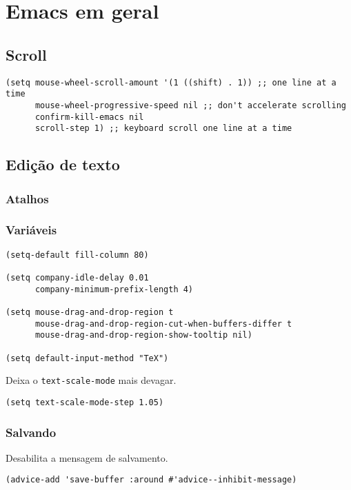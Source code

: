 \documentclass[11pt]{article}
\begin{document}
\section{Emacs em geral}
\label{sec:org9572b80}
\subsection{Scroll}
\label{sec:org4892092}
\begin{verbatim}
(setq mouse-wheel-scroll-amount '(1 ((shift) . 1)) ;; one line at a time
      mouse-wheel-progressive-speed nil ;; don't accelerate scrolling
      confirm-kill-emacs nil
      scroll-step 1) ;; keyboard scroll one line at a time
\end{verbatim}

\subsection{Edição de texto}
\label{sec:org3cc2396}
\subsubsection{Atalhos}
\label{sec:org36a08b4}
\subsubsection{Variáveis}
\label{sec:orgeaff0ac}
\begin{verbatim}
(setq-default fill-column 80)

(setq company-idle-delay 0.01
      company-minimum-prefix-length 4)

(setq mouse-drag-and-drop-region t
      mouse-drag-and-drop-region-cut-when-buffers-differ t
      mouse-drag-and-drop-region-show-tooltip nil)

(setq default-input-method "TeX")
\end{verbatim}

Deixa o \texttt{text-scale-mode} mais devagar.

\begin{verbatim}
(setq text-scale-mode-step 1.05)
\end{verbatim}
\subsubsection{Salvando}
\label{sec:org403bc5c}
Desabilita a mensagem de salvamento.

\begin{verbatim}
(advice-add 'save-buffer :around #'advice--inhibit-message)
\end{verbatim}
\end{document}
